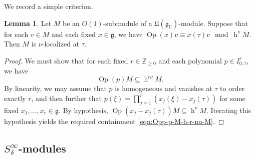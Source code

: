 \documentclass[reqno]{amsart}
\DeclareMathOperator{\h}{h}
\DeclareMathOperator{\Opp}{Op}
\theoremstyle{plain} \newtheorem{theorem} {Theorem}
\theoremstyle{definition} \newtheorem{definition} [theorem] {Definition}
\theoremstyle{itplain} %
\newtheorem{lemma}[theorem]{Lemma}
\numberwithin{equation}{section}
\numberwithin{theorem}{section}
\renewcommand{\geq}{\geqslant}
\begin{document}
We record a simple criterion.
\begin{lemma}\label{lem:localization-criterion-degree-1}
  Let $M$ be an $O(1)$-submodule of a $\mathfrak{U}(\mathfrak{g}_\mathbb{C})$-module.  Suppose that for each $v \in M$ and each fixed $x \in \mathfrak{g}$, we have $\Opp(x) v \equiv x(\tau) v \mod{\h^\nu M}$.  Then $M$ is $\nu$-localized at $\tau$.
\end{lemma}
\begin{proof}
  We must show that for each fixed $r \in \mathbb{Z}_{\geq 0}$ and each polynomial $p \in I^r_{0,\tau}$, we have
  \begin{equation}\label{eqn:Opp-p-M-h-r-nu-M}
    \Opp(p) M \subseteq  \h^{r \nu} M.
  \end{equation}
  By linearity, we may assume that $p$ is homogeneous and vanishes at $\tau$ to order exactly $r$, and then further that $p(\xi) = \prod_{j=1}^r (x_j(\xi) - x_j(\tau))$ for some fixed $x_1,\dotsc,x_r \in \mathfrak{g}$.  By hypothesis, $\Opp(x_j - x_j(\tau)) M \subseteq \h^{\nu} M$.  Iterating this hypothesis yields the required containment \eqref{eqn:Opp-p-M-h-r-nu-M}.
\end{proof}

\subsection{$S^\infty_\delta$-modules}\label{sec:sinfty_delta-modules}
\end{document}
